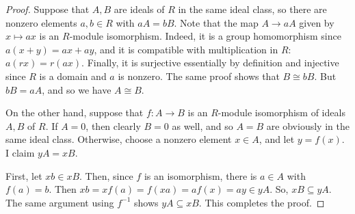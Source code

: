 \begin{proof}
    Suppose that $A,B$ are ideals of $R$ in the same ideal class, so there are nonzero elements $a,b \in R$ with $aA = bB$. Note that the map $A \to aA$ given by $x \mapsto ax$ is an $R$-module isomorphism. Indeed, it is a group homomorphism since $a(x+y) = ax+ay$, and it is compatible with multiplication in $R$: $a(rx) = r(ax)$. Finally, it is surjective essentially by definition and injective since $R$ is a domain and $a$ is nonzero. The same proof shows that $B \cong bB$. But $bB = aA$, and so we have $A \cong B$.

    On the other hand, suppose that $f : A \to B$ is an $R$-module isomorphism of ideals $A,B$ of $R$. If $A = 0$, then clearly $B=0$ as well, and so $A=B$ are obviously in the same ideal class. Otherwise, choose a nonzero element $x \in A$, and let $y = f(x)$. I claim $yA = xB$.

    First, let $xb \in xB$. Then, since $f$ is an isomorphism, there is $a \in A$ with $f(a) = b$. Then $xb = xf(a) = f(xa) = af(x) = ay \in yA$. So, $xB \subseteq yA$. The same argument using $f^{-1}$ shows $yA \subseteq xB$. This completes the proof.
\end{proof}